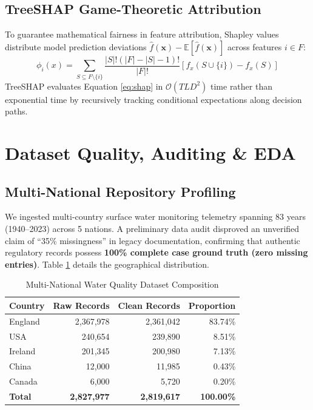 \documentclass[conference]{IEEEtran}
\begin{document}
\subsection{TreeSHAP Game-Theoretic Attribution}
To guarantee mathematical fairness in feature attribution, Shapley values distribute model prediction deviations $\hat{f}(\mathbf{x}) - \mathbb{E}[\hat{f}(\mathbf{x})]$ across features $i \in F$:
\begin{equation}
\phi_i(x) = \sum_{S \subseteq F \setminus \{i\}} \frac{|S|!(|F| - |S| - 1)!}{|F|!} \left[ f_x(S \cup \{i\}) - f_x(S) \right]
\label{eq:shap}
\end{equation}
TreeSHAP evaluates Equation \eqref{eq:shap} in $\mathcal{O}(T L D^2)$ time rather than exponential time by recursively tracking conditional expectations along decision paths.

\section{Dataset Quality, Auditing \& EDA}

\subsection{Multi-National Repository Profiling}
We ingested multi-country surface water monitoring telemetry spanning 83 years (1940--2023) across 5 nations. A preliminary data audit disproved an unverified claim of ``35\% missingness'' in legacy documentation, confirming that authentic regulatory records possess \textbf{100\% complete case ground truth (zero missing entries)}. Table \ref{tab:dataset_profile} details the geographical distribution.

\begin{table}[htbp]
\caption{Multi-National Water Quality Dataset Composition}
\label{tab:dataset_profile}
\centering
\begin{tabular}{lrrr}
\toprule
\textbf{Country} & \textbf{Raw Records} & \textbf{Clean Records} & \textbf{Proportion} \\
\midrule
England & 2,367,978 & 2,361,042 & 83.74\% \\
USA & 240,654 & 239,890 & 8.51\% \\
Ireland & 201,345 & 200,980 & 7.13\% \\
China & 12,000 & 11,985 & 0.43\% \\
Canada & 6,000 & 5,720 & 0.20\% \\
\midrule
\textbf{Total} & \textbf{2,827,977} & \textbf{2,819,617} & \textbf{100.00\%} \\
\bottomrule
\end{tabular}
\end{table}
\end{document}

